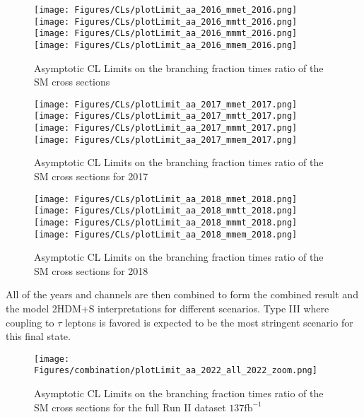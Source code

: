 \begin{figure}[ht!b]
  \centering
  \texttt{[image: Figures/CLs/plotLimit\_aa\_2016\_mmet\_2016.png]}
  \texttt{[image: Figures/CLs/plotLimit\_aa\_2016\_mmtt\_2016.png]}\\
  \texttt{[image: Figures/CLs/plotLimit\_aa\_2016\_mmmt\_2016.png]}
  \texttt{[image: Figures/CLs/plotLimit\_aa\_2016\_mmem\_2016.png]}\\
    \caption{\label{fig:CLs2016} Asymptotic CL Limits on the branching fraction times ratio of the SM cross sections}
\end{figure}

\begin{figure}[ht!b]
  \centering
  \texttt{[image: Figures/CLs/plotLimit\_aa\_2017\_mmet\_2017.png]}
  \texttt{[image: Figures/CLs/plotLimit\_aa\_2017\_mmtt\_2017.png]}\\
  \texttt{[image: Figures/CLs/plotLimit\_aa\_2017\_mmmt\_2017.png]}
  \texttt{[image: Figures/CLs/plotLimit\_aa\_2017\_mmem\_2017.png]}\\
    \caption{\label{fig:CLs2017} Asymptotic CL Limits on the branching fraction times ratio of the SM cross sections for 2017}
\end{figure}

\begin{figure}[ht!b]
  \centering
  \texttt{[image: Figures/CLs/plotLimit\_aa\_2018\_mmet\_2018.png]}
  \texttt{[image: Figures/CLs/plotLimit\_aa\_2018\_mmtt\_2018.png]}\\
  \texttt{[image: Figures/CLs/plotLimit\_aa\_2018\_mmmt\_2018.png]}
  \texttt{[image: Figures/CLs/plotLimit\_aa\_2018\_mmem\_2018.png]}\\
    \caption{\label{fig:CLs2018} Asymptotic CL Limits on the branching fraction times ratio of the SM cross sections for 2018}
\end{figure}

\clearpage

All of the years and channels are then combined to form the combined result and the model 2HDM+S interpretations for different scenarios. Type III where coupling to $\tau$ leptons is favored is expected to be the most stringent scenario for this final state. 

\begin{figure}[ht!b]
  \texttt{[image: Figures/combination/plotLimit\_aa\_2022\_all\_2022\_zoom.png]}
    \caption{\label{fig:CLsRunII} Asymptotic CL Limits on the branching fraction times ratio of the SM cross sections for the full Run II dataset $\text{137}\text{fb}^{-1}$}
\end{figure}

